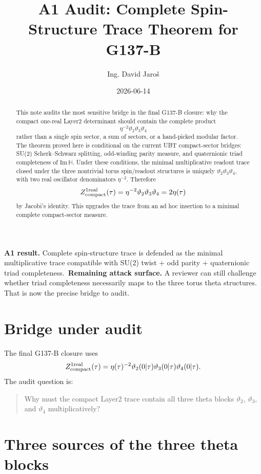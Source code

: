 \documentclass[12pt,a4paper]{article}
\title{A1 Audit: Complete Spin-Structure Trace Theorem for G137-B}
\author{Ing. David Jaroš}
\date{2026-06-14}
\begin{document}
\maketitle

\begin{abstract}
This note audits the most sensitive bridge in the final G137-B closure: why the
compact one-real Layer2 determinant should contain the complete product
\[
  \eta^{-2}\vartheta_2\vartheta_3\vartheta_4
\]
rather than a single spin sector, a sum of sectors, or a hand-picked modular
factor.  The theorem proved here is conditional on the current UBT compact-sector
bridges: SU(2) Scherk--Schwarz splitting, odd-winding parity measure, and
quaternionic triad completeness of $\mathrm{Im}\,\mathbb H$.  Under these
conditions, the minimal multiplicative readout trace closed under the three
nontrivial torus spin/readout structures is uniquely
$\vartheta_2\vartheta_3\vartheta_4$, with two real oscillator denominators
$\eta^{-2}$.  Therefore
\[
  Z_{\rm compact}^{1\rm real}(\tau)
  =\eta^{-2}\vartheta_2\vartheta_3\vartheta_4=2\eta(\tau)
\]
by Jacobi's identity.  This upgrades the trace from an ad hoc insertion to a
minimal complete compact-sector measure.
\end{abstract}

\begin{statusbox}
\textbf{A1 result.} Complete spin-structure trace is defended as the minimal
multiplicative trace compatible with SU(2) twist + odd parity + quaternionic
triad completeness.\
\textbf{Remaining attack surface.} A reviewer can still challenge whether
triad completeness necessarily maps to the three torus theta structures.  That
is now the precise bridge to audit.
\end{statusbox}

\section{Bridge under audit}

The final G137-B closure uses
\[
  Z_{\rm compact}^{1\rm real}(\tau)
  =\eta(\tau)^{-2}\vartheta_2(0|\tau)\vartheta_3(0|\tau)\vartheta_4(0|\tau).
\]
The audit question is:
\begin{quote}
Why must the compact Layer2 trace contain all three theta blocks
$\vartheta_2$, $\vartheta_3$, and $\vartheta_4$ multiplicatively?
\end{quote}

\section{Three sources of the three theta blocks}
\end{document}
